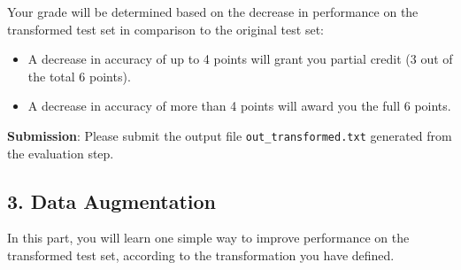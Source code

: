 \documentclass{article}
\theoremstyle{case}
\theoremstyle{definition}
\begin{document}
\begin{enumerate}
    Your grade will be determined based on the decrease in performance on the transformed test set in comparison to the original test set:
    \begin{itemize}
        \item A decrease in accuracy of up to 4 points will grant you partial credit (3 out of the total 6 points).
        \item A decrease in accuracy of more than 4 points will award you the full 6 points.
    \end{itemize}
    \textbf{Submission}: Please submit the output file \texttt{out\_transformed.txt} generated from the evaluation step.



\end{enumerate}

\newpage
\subsection*{3. Data Augmentation}

In this part, you will learn one simple way to improve performance on the transformed test set, according to the transformation you have defined.
\end{document}
